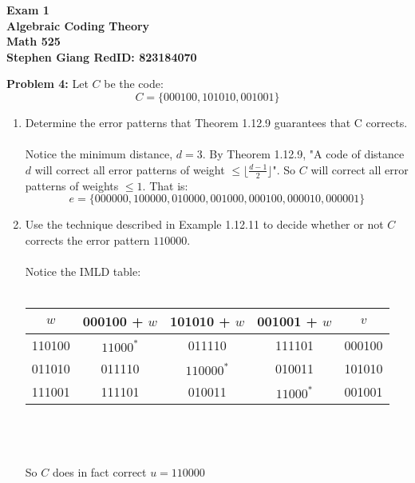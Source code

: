 \documentclass[11pt]{article}
\newenvironment{problem}[1]{\textbf{Problem #1: }}{\newpage}
\begin{document}
	
	\begin{center}
		\textbf{Exam 1} \\
		\textbf{Algebraic Coding Theory} \\
		\textbf{Math 525} \\
		\textbf{Stephen Giang RedID: 823184070} \\
	\end{center}

	\begin{problem}{4}
	Let $C$ be the code: 
	\[C = \{ 000100, 101010, 001001 \}\]
	\begin{enumerate}
		\item Determine the error patterns that Theorem 1.12.9 guarantees that C corrects.
		\\ \\
		Notice the minimum distance, $d = 3$.  By Theorem 1.12.9, "A code of distance $d$ will correct all error patterns of weight $\leq \lfloor \frac{d-1}{2}\rfloor$".  So $C$ will correct all error patterns of weights $\leq 1$. That is:
		\[e = \{000000, 100000, 010000, 001000, 000100, 000010, 000001\}\]
		\item Use the technique described in Example 1.12.11 to decide whether or not $C$ corrects the error pattern $110000$.
		\\ \\
		Notice the IMLD table: \\ \\
		\begin{tabular}{| c | c | c | c | c |}
			\hline
			$w$ & 000100 + $w$ & 101010 + $w$ & 001001 + $w$ & $v$ \\
			\hline
			110100 &  $11000^*$ & 011110 & 111101 & 000100 \\
			\hline
			011010 &  011110 & $110000^*$ & 010011 & 101010 \\
			\hline
			111001 & 111101 & 010011 & $11000^*$ & 001001 \\
			\hline
		\end{tabular}
		\\ \\ \\
		So $C$ does in fact correct $u = 110000$
	\end{enumerate}
\end{problem}
\end{document}
